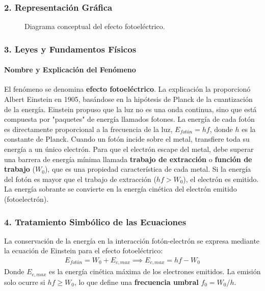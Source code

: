 \subsubsection*{2. Representación Gráfica}
\begin{figure}[H]
    \centering
    \caption{Diagrama conceptual del efecto fotoeléctrico.}
\end{figure}

\subsubsection*{3. Leyes y Fundamentos Físicos}
\paragraph*{Nombre y Explicación del Fenómeno}
El fenómeno se denomina \textbf{efecto fotoeléctrico}. La explicación la proporcionó Albert Einstein en 1905, basándose en la hipótesis de Planck de la cuantización de la energía. Einstein propuso que la luz no es una onda continua, sino que está compuesta por "paquetes" de energía llamados fotones. La energía de cada fotón es directamente proporcional a la frecuencia de la luz, $E_{fotón} = hf$, donde $h$ es la constante de Planck.
Cuando un fotón incide sobre el metal, transfiere toda su energía a un único electrón. Para que el electrón escape del metal, debe superar una barrera de energía mínima llamada \textbf{trabajo de extracción} o \textbf{función de trabajo} ($W_0$), que es una propiedad característica de cada metal. Si la energía del fotón es mayor que el trabajo de extracción ($hf > W_0$), el electrón es emitido. La energía sobrante se convierte en la energía cinética del electrón emitido (fotoelectrón).

\subsubsection*{4. Tratamiento Simbólico de las Ecuaciones}
La conservación de la energía en la interacción fotón-electrón se expresa mediante la ecuación de Einstein para el efecto fotoeléctrico:
\begin{gather}
    E_{fotón} = W_0 + E_{c,max} \implies E_{c,max} = hf - W_0
\end{gather}
Donde $E_{c,max}$ es la energía cinética máxima de los electrones emitidos. La emisión solo ocurre si $hf \ge W_0$, lo que define una \textbf{frecuencia umbral} $f_0 = W_0/h$.

